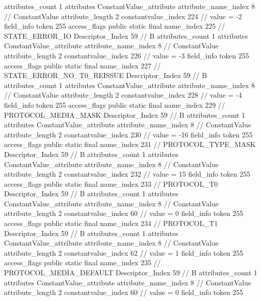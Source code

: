 {{{{{				attributes_count	1
				attributes {
				ConstantValue_attribute {
					attribute_name_index	8		// ConstantValue
					attribute_length	2
					constantvalue_index	224		// value = -2
				}
				}
			}
			field_info {
				token	255
				access_flags	public static final
				name_index	225		// STATE_ERROR_IO
				Descriptor_Index	59		// B
				attributes_count	1
				attributes {
				ConstantValue_attribute {
					attribute_name_index	8		// ConstantValue
					attribute_length	2
					constantvalue_index	226		// value = -3
				}
				}
			}
			field_info {
				token	255
				access_flags	public static final
				name_index	227		// STATE_ERROR_NO_T0_REISSUE
				Descriptor_Index	59		// B
				attributes_count	1
				attributes {
				ConstantValue_attribute {
					attribute_name_index	8		// ConstantValue
					attribute_length	2
					constantvalue_index	228		// value = -4
				}
				}
			}
			field_info {
				token	255
				access_flags	public static final
				name_index	229		// PROTOCOL_MEDIA_MASK
				Descriptor_Index	59		// B
				attributes_count	1
				attributes {
				ConstantValue_attribute {
					attribute_name_index	8		// ConstantValue
					attribute_length	2
					constantvalue_index	230		// value = -16
				}
				}
			}
			field_info {
				token	255
				access_flags	public static final
				name_index	231		// PROTOCOL_TYPE_MASK
				Descriptor_Index	59		// B
				attributes_count	1
				attributes {
				ConstantValue_attribute {
					attribute_name_index	8		// ConstantValue
					attribute_length	2
					constantvalue_index	232		// value = 15
				}
				}
			}
			field_info {
				token	255
				access_flags	public static final
				name_index	233		// PROTOCOL_T0
				Descriptor_Index	59		// B
				attributes_count	1
				attributes {
				ConstantValue_attribute {
					attribute_name_index	8		// ConstantValue
					attribute_length	2
					constantvalue_index	60		// value = 0
				}
				}
			}
			field_info {
				token	255
				access_flags	public static final
				name_index	234		// PROTOCOL_T1
				Descriptor_Index	59		// B
				attributes_count	1
				attributes {
				ConstantValue_attribute {
					attribute_name_index	8		// ConstantValue
					attribute_length	2
					constantvalue_index	62		// value = 1
				}
				}
			}
			field_info {
				token	255
				access_flags	public static final
				name_index	235		// PROTOCOL_MEDIA_DEFAULT
				Descriptor_Index	59		// B
				attributes_count	1
				attributes {
				ConstantValue_attribute {
					attribute_name_index	8		// ConstantValue
					attribute_length	2
					constantvalue_index	60		// value = 0
				}
				}
			}
			field_info {
				token	255
}}}}}
